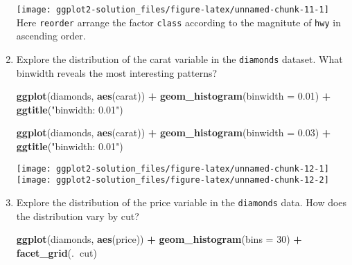\documentclass[]{book}
\newenvironment{Shaded}{\begin{snugshade}}{\end{snugshade}}
\newcommand{\KeywordTok}[1]{\textcolor[rgb]{0.13,0.29,0.53}{\textbf{#1}}}
\newcommand{\DataTypeTok}[1]{\textcolor[rgb]{0.13,0.29,0.53}{#1}}
\newcommand{\DecValTok}[1]{\textcolor[rgb]{0.00,0.00,0.81}{#1}}
\newcommand{\FloatTok}[1]{\textcolor[rgb]{0.00,0.00,0.81}{#1}}
\newcommand{\StringTok}[1]{\textcolor[rgb]{0.31,0.60,0.02}{#1}}
\newcommand{\OperatorTok}[1]{\textcolor[rgb]{0.81,0.36,0.00}{\textbf{#1}}}
\newcommand{\NormalTok}[1]{#1}
\begin{document}
\begin{enumerate}
  \texttt{[image: ggplot2-solution\_files/figure-latex/unnamed-chunk-11-1]}
  Here \texttt{reorder} arrange the factor \texttt{class} according to
  the magnitute of \texttt{hwy} in ascending order.
\item
  Explore the distribution of the carat variable in the
  \texttt{diamonds} dataset. What binwidth reveals the most interesting
  patterns?

\begin{Shaded}
\begin{Highlighting}[]
\KeywordTok{ggplot}\NormalTok{(diamonds, }\KeywordTok{aes}\NormalTok{(carat)) }\OperatorTok{+}\StringTok{ }
\StringTok{  }\KeywordTok{geom_histogram}\NormalTok{(}\DataTypeTok{binwidth =} \FloatTok{0.01}\NormalTok{) }\OperatorTok{+}\StringTok{ }
\StringTok{  }\KeywordTok{ggtitle}\NormalTok{(}\StringTok{"binwidth: 0.01"}\NormalTok{)}

\KeywordTok{ggplot}\NormalTok{(diamonds, }\KeywordTok{aes}\NormalTok{(carat)) }\OperatorTok{+}\StringTok{ }
\StringTok{  }\KeywordTok{geom_histogram}\NormalTok{(}\DataTypeTok{binwidth =} \FloatTok{0.03}\NormalTok{) }\OperatorTok{+}\StringTok{ }
\StringTok{  }\KeywordTok{ggtitle}\NormalTok{(}\StringTok{"binwidth: 0.01"}\NormalTok{)}
\end{Highlighting}
\end{Shaded}

  \texttt{[image: ggplot2-solution\_files/figure-latex/unnamed-chunk-12-1]}
  \texttt{[image: ggplot2-solution\_files/figure-latex/unnamed-chunk-12-2]}
\item
  Explore the distribution of the price variable in the
  \texttt{diamonds} data. How does the distribution vary by cut?

\begin{Shaded}
\begin{Highlighting}[]
\KeywordTok{ggplot}\NormalTok{(diamonds, }\KeywordTok{aes}\NormalTok{(price)) }\OperatorTok{+}\StringTok{ }
\StringTok{  }\KeywordTok{geom_histogram}\NormalTok{(}\DataTypeTok{bins =} \DecValTok{30}\NormalTok{) }\OperatorTok{+}
\StringTok{  }\KeywordTok{facet_grid}\NormalTok{(.}\OperatorTok{~}\NormalTok{cut)}
\end{Highlighting}
\end{Shaded}


\end{enumerate}
\end{document}
